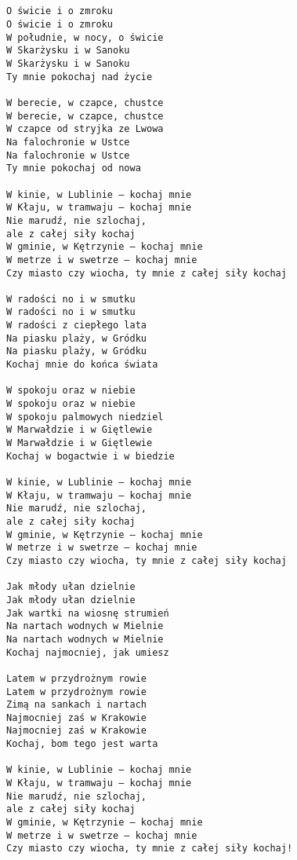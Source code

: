 \documentclass[12pt]{article}
\begin{document}
\subsection*{}
\begin{verbatim}
O świcie i o zmroku
O świcie i o zmroku
W południe, w nocy, o świcie
W Skarżysku i w Sanoku
W Skarżysku i w Sanoku
Ty mnie pokochaj nad życie

W berecie, w czapce, chustce
W berecie, w czapce, chustce
W czapce od stryjka ze Lwowa
Na falochronie w Ustce
Na falochronie w Ustce
Ty mnie pokochaj od nowa

W kinie, w Lublinie – kochaj mnie
W Kłaju, w tramwaju – kochaj mnie
Nie marudź, nie szlochaj,
ale z całej siły kochaj
W gminie, w Kętrzynie – kochaj mnie
W metrze i w swetrze – kochaj mnie
Czy miasto czy wiocha, ty mnie z całej siły kochaj

W radości no i w smutku
W radości no i w smutku
W radości z ciepłego lata
Na piasku plaży, w Gródku
Na piasku plaży, w Gródku
Kochaj mnie do końca świata

W spokoju oraz w niebie
W spokoju oraz w niebie
W spokoju palmowych niedziel
W Marwałdzie i w Giętlewie
W Marwałdzie i w Giętlewie
Kochaj w bogactwie i w biedzie

W kinie, w Lublinie – kochaj mnie
W Kłaju, w tramwaju – kochaj mnie
Nie marudź, nie szlochaj,
ale z całej siły kochaj
W gminie, w Kętrzynie – kochaj mnie
W metrze i w swetrze – kochaj mnie
Czy miasto czy wiocha, ty mnie z całej siły kochaj

Jak młody ułan dzielnie
Jak młody ułan dzielnie
Jak wartki na wiosnę strumień
Na nartach wodnych w Mielnie
Na nartach wodnych w Mielnie
Kochaj najmocniej, jak umiesz

Latem w przydrożnym rowie
Latem w przydrożnym rowie
Zimą na sankach i nartach
Najmocniej zaś w Krakowie
Najmocniej zaś w Krakowie
Kochaj, bom tego jest warta

W kinie, w Lublinie – kochaj mnie
W Kłaju, w tramwaju – kochaj mnie
Nie marudź, nie szlochaj,
ale z całej siły kochaj
W gminie, w Kętrzynie – kochaj mnie
W metrze i w swetrze – kochaj mnie
Czy miasto czy wiocha, ty mnie z całej siły kochaj!
\end{verbatim}
\clearpage
\end{document}
